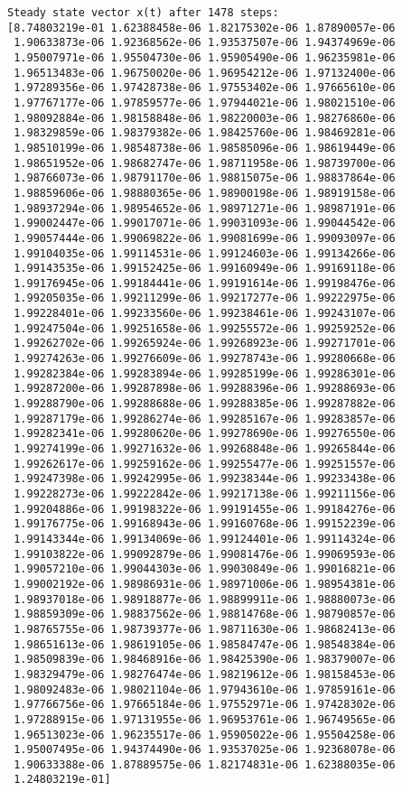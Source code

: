 \documentclass[11pt]{article}
\begin{document}
\begin{Verbatim}[commandchars=\\\{\}]
Steady state vector x(t) after 1478 steps:
[8.74803219e-01 1.62388458e-06 1.82175302e-06 1.87890057e-06
 1.90633873e-06 1.92368562e-06 1.93537507e-06 1.94374969e-06
 1.95007971e-06 1.95504730e-06 1.95905490e-06 1.96235981e-06
 1.96513483e-06 1.96750020e-06 1.96954212e-06 1.97132400e-06
 1.97289356e-06 1.97428738e-06 1.97553402e-06 1.97665610e-06
 1.97767177e-06 1.97859577e-06 1.97944021e-06 1.98021510e-06
 1.98092884e-06 1.98158848e-06 1.98220003e-06 1.98276860e-06
 1.98329859e-06 1.98379382e-06 1.98425760e-06 1.98469281e-06
 1.98510199e-06 1.98548738e-06 1.98585096e-06 1.98619449e-06
 1.98651952e-06 1.98682747e-06 1.98711958e-06 1.98739700e-06
 1.98766073e-06 1.98791170e-06 1.98815075e-06 1.98837864e-06
 1.98859606e-06 1.98880365e-06 1.98900198e-06 1.98919158e-06
 1.98937294e-06 1.98954652e-06 1.98971271e-06 1.98987191e-06
 1.99002447e-06 1.99017071e-06 1.99031093e-06 1.99044542e-06
 1.99057444e-06 1.99069822e-06 1.99081699e-06 1.99093097e-06
 1.99104035e-06 1.99114531e-06 1.99124603e-06 1.99134266e-06
 1.99143535e-06 1.99152425e-06 1.99160949e-06 1.99169118e-06
 1.99176945e-06 1.99184441e-06 1.99191614e-06 1.99198476e-06
 1.99205035e-06 1.99211299e-06 1.99217277e-06 1.99222975e-06
 1.99228401e-06 1.99233560e-06 1.99238461e-06 1.99243107e-06
 1.99247504e-06 1.99251658e-06 1.99255572e-06 1.99259252e-06
 1.99262702e-06 1.99265924e-06 1.99268923e-06 1.99271701e-06
 1.99274263e-06 1.99276609e-06 1.99278743e-06 1.99280668e-06
 1.99282384e-06 1.99283894e-06 1.99285199e-06 1.99286301e-06
 1.99287200e-06 1.99287898e-06 1.99288396e-06 1.99288693e-06
 1.99288790e-06 1.99288688e-06 1.99288385e-06 1.99287882e-06
 1.99287179e-06 1.99286274e-06 1.99285167e-06 1.99283857e-06
 1.99282341e-06 1.99280620e-06 1.99278690e-06 1.99276550e-06
 1.99274199e-06 1.99271632e-06 1.99268848e-06 1.99265844e-06
 1.99262617e-06 1.99259162e-06 1.99255477e-06 1.99251557e-06
 1.99247398e-06 1.99242995e-06 1.99238344e-06 1.99233438e-06
 1.99228273e-06 1.99222842e-06 1.99217138e-06 1.99211156e-06
 1.99204886e-06 1.99198322e-06 1.99191455e-06 1.99184276e-06
 1.99176775e-06 1.99168943e-06 1.99160768e-06 1.99152239e-06
 1.99143344e-06 1.99134069e-06 1.99124401e-06 1.99114324e-06
 1.99103822e-06 1.99092879e-06 1.99081476e-06 1.99069593e-06
 1.99057210e-06 1.99044303e-06 1.99030849e-06 1.99016821e-06
 1.99002192e-06 1.98986931e-06 1.98971006e-06 1.98954381e-06
 1.98937018e-06 1.98918877e-06 1.98899911e-06 1.98880073e-06
 1.98859309e-06 1.98837562e-06 1.98814768e-06 1.98790857e-06
 1.98765755e-06 1.98739377e-06 1.98711630e-06 1.98682413e-06
 1.98651613e-06 1.98619105e-06 1.98584747e-06 1.98548384e-06
 1.98509839e-06 1.98468916e-06 1.98425390e-06 1.98379007e-06
 1.98329479e-06 1.98276474e-06 1.98219612e-06 1.98158453e-06
 1.98092483e-06 1.98021104e-06 1.97943610e-06 1.97859161e-06
 1.97766756e-06 1.97665184e-06 1.97552971e-06 1.97428302e-06
 1.97288915e-06 1.97131955e-06 1.96953761e-06 1.96749565e-06
 1.96513023e-06 1.96235517e-06 1.95905022e-06 1.95504258e-06
 1.95007495e-06 1.94374490e-06 1.93537025e-06 1.92368078e-06
 1.90633388e-06 1.87889575e-06 1.82174831e-06 1.62388035e-06
 1.24803219e-01]



\end{Verbatim}
\end{document}
